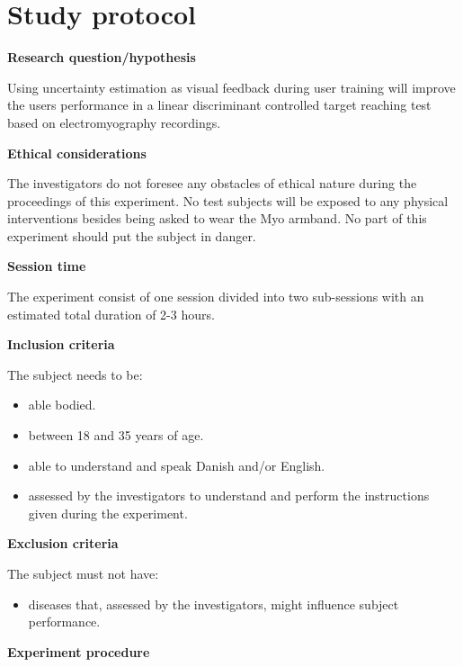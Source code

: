 \section*{Study protocol}

\textbf{Research question/hypothesis}

Using uncertainty estimation as visual feedback during user training will improve the users performance in a linear discriminant controlled target reaching test based on electromyography recordings.

\textbf{Ethical considerations}  

The investigators do not foresee any obstacles of ethical nature during the proceedings of this experiment. No test subjects will be exposed to any physical interventions besides being asked to wear the Myo armband. No part of this experiment should put the subject in danger. 

\textbf{Session time}

The experiment consist of one session divided into two sub-sessions with an estimated total duration of 2-3 hours.

\textbf{Inclusion criteria}

The subject needs to be:
\begin{itemize}
	\item able bodied.
	\item between 18 and 35 years of age.
	\item able to understand and speak Danish and/or English.
	\item assessed by the investigators to understand and perform the instructions given during the experiment. 
\end{itemize}


\textbf{Exclusion criteria}

The subject must not have:
\begin{itemize}
	\item diseases that, assessed by the investigators, might influence subject performance.
\end{itemize}


\textbf{Experiment procedure}

